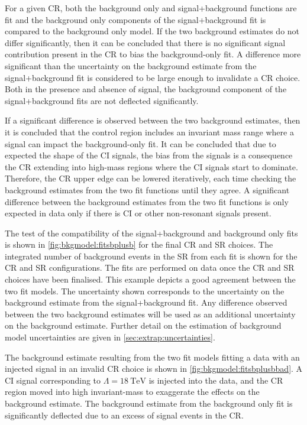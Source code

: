For a given CR, both the background only and signal+background functions are fit and the background only components of the signal+background fit is compared to the background only model. If the two background estimates do not differ significantly, then it can be concluded that there is no significant signal contribution present in the CR to bias the background-only fit. A difference  more significant than the uncertainty on the background estimate from the signal+background fit is considered to be large enough to invalidate a CR choice. Both in the presence and absence of signal, the background component of the signal+background fits are not deflected significantly. 

If a significant difference is observed between the two background estimates, then it is concluded that the control region includes an invariant mass range where a signal can impact the background-only fit. It can be concluded that due to expected the shape of the CI signals, the bias from the signals is a consequence the CR extending into high-mass regions where the CI signals start to dominate. Therefore, the CR upper edge can be lowered iteratively, each time checking the background estimates from the two fit functions until they agree. A significant difference between the background estimates from the two fit functions is only expected in data only if there is CI or other non-resonant signals present. 

The test of the compatibility of the signal+background and background only fits is shown in \cref{fig:bkgmodel:fitsbplusb} for the final CR and SR choices. The integrated number of background events in the SR from each fit is shown for the CR and SR configurations. The fits are performed on data once the CR and SR choices have been finalised. This example depicts a good agreement between the two fit models. The uncertainty shown corresponds to the uncertainty on the background estimate from the signal+background fit. Any difference observed between the two background estimates will be used as an additional uncertainty on the background estimate. Further detail on the estimation of background model uncertainties are given in \cref{sec:extrap:uncertainties}. 

The background estimate resulting from the two fit models fitting a data with an injected signal in an invalid CR choice is shown in \cref{fig:bkgmodel:fitsbplusbbad}. A CI signal corresponding to $\Lambda = \SI{18}{\tera\electronvolt}$ is injected into the data, and the CR region moved into high invariant-mass to exaggerate the effects on the background estimate. The background estimate from the background only fit is significantly deflected due to an excess of signal events in the CR.

